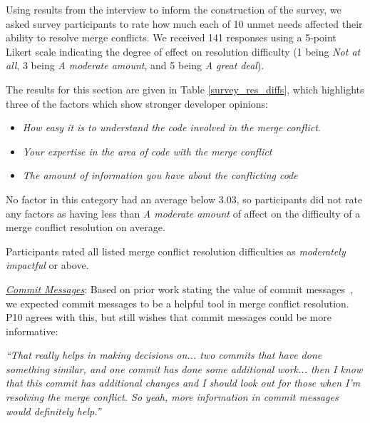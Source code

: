 Using results from the interview to inform the construction of the survey, we asked survey participants to rate how much each of 10 unmet needs affected their ability to resolve merge conflicts.
We received 141 responses using a 5-point Likert scale indicating the degree of effect on resolution difficulty (1 being \textit{Not at all}, 3 being \textit{A moderate amount}, and 5 being \textit{A great deal}).

The results for this section are given in Table \ref{survey_res_diffs}, which highlights three of the factors which show stronger developer opinions:
\begin{itemize}
\item \textit{How easy it is to understand the code involved in the merge conflict}. 
\item \textit{Your expertise in the area of code with the merge conflict}
\item \textit{The amount of information you have about the conflicting code} 
\end{itemize} 

No factor in this category had an average below 3.03, so participants did not rate any factors as having less than \textit{A moderate amount} of affect on the difficulty of a merge conflict resolution on average.
\begin{tcolorbox}[enhanced,minipage boxed title,enhanced,title={Takeaway \arabic{takeawaycounter}},
attach boxed title to top left=
{xshift=0mm,yshift=-1mm},
boxed title style={size=small}]
Participants rated all listed merge conflict resolution difficulties as \textit{moderately impactful} or above.
\end{tcolorbox}
\addtocounter{takeawaycounter}{1}

\underline{\textit{Commit Messages}}:
Based on prior work stating the value of commit messages~\cite{yamauchi2014clustering}\cite{hindle2009automatic}\cite{cortes2014automatically}\cite{hattori2008nature}, we expected commit messages to be a helpful tool in merge conflict resolution. 
P10 agrees with this, but still wishes that commit messages could be more informative:
\begin{displayquote}
	\textit{``That really helps in making decisions on... two commits that have done something similar, and one commit has done some additional work... then I know that this commit has additional changes and I should look out for those when I'm resolving the merge conflict. So yeah, more information in commit messages would definitely help.''}
\end{displayquote}

